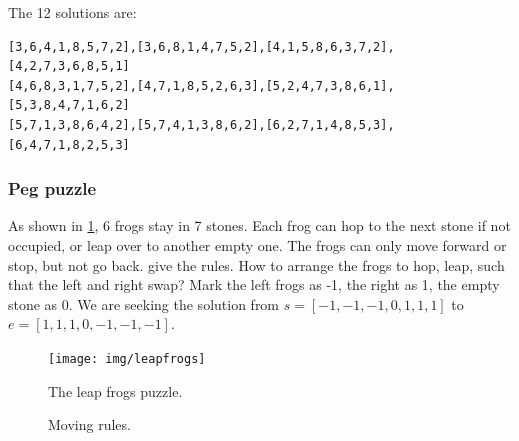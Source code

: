 \documentclass[b5paper]{article}
\begin{document}
\begin{Answer}[ref = {ex:queens-puzzle}]
{

The 12 solutions are:
\begin{Verbatim}[fontsize=\footnotesize]
[3,6,4,1,8,5,7,2],[3,6,8,1,4,7,5,2],[4,1,5,8,6,3,7,2],[4,2,7,3,6,8,5,1]
[4,6,8,3,1,7,5,2],[4,7,1,8,5,2,6,3],[5,2,4,7,3,8,6,1],[5,3,8,4,7,1,6,2]
[5,7,1,3,8,6,4,2],[5,7,4,1,3,8,6,2],[6,2,7,1,4,8,5,3],[6,4,7,1,8,2,5,3]
\end{Verbatim}
}
\end{Answer}

\subsubsection{Peg puzzle}

As shown in \cref{fig:leapfrog}, 6 frogs stay in 7 stones. Each frog can hop to the next stone if not occupied, or leap over to another empty one. The frogs can only move forward or stop, but not go back.  give the rules. How to arrange the frogs to hop, leap, such that the left and right swap? Mark the left frogs as -1, the right as 1, the empty stone as 0. We are seeking the solution from $s = [-1, -1, -1, 0, 1, 1, 1]$ to $e = [1, 1, 1, 0, -1, -1, -1]$.

\begin{figure}[htbp]
 \centering
 \texttt{[image: img/leapfrogs]}
 \caption{The leap frogs puzzle.}
 \label{fig:leapfrog}
\end{figure}

\begin{figure}[htbp]
 \centering
  \hspace{0.02\textwidth}
  \hspace{0.02\textwidth}
 \caption{Moving rules.}
 \label{fig:pegrules}
\end{figure}
\end{document}
